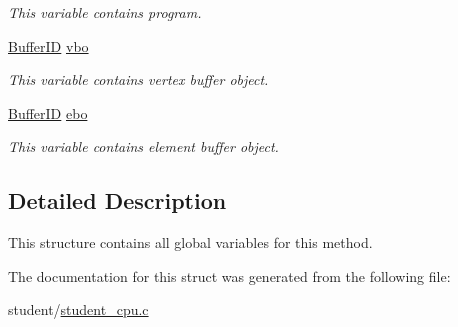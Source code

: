 \begin{DoxyCompactItemize}
\begin{DoxyCompactList}\small\item\em This variable contains program. \end{DoxyCompactList}\item 
\hyperlink{fwd_8h_a60a12bf4868ebe47cc571ce96a03f99c}{Buffer\+ID} \hyperlink{structPhongVariables_ab41615ade794f33643841f5ea1b6072e}{vbo}\hypertarget{structPhongVariables_ab41615ade794f33643841f5ea1b6072e}{}\label{structPhongVariables_ab41615ade794f33643841f5ea1b6072e}

\begin{DoxyCompactList}\small\item\em This variable contains vertex buffer object. \end{DoxyCompactList}\item 
\hyperlink{fwd_8h_a60a12bf4868ebe47cc571ce96a03f99c}{Buffer\+ID} \hyperlink{structPhongVariables_a5aa6df055cd88b0acbcccd99d5ff25cb}{ebo}\hypertarget{structPhongVariables_a5aa6df055cd88b0acbcccd99d5ff25cb}{}\label{structPhongVariables_a5aa6df055cd88b0acbcccd99d5ff25cb}

\begin{DoxyCompactList}\small\item\em This variable contains element buffer object. \end{DoxyCompactList}\end{DoxyCompactItemize}


\subsection{Detailed Description}
This structure contains all global variables for this method. 

The documentation for this struct was generated from the following file\+:\begin{DoxyCompactItemize}
\item 
student/\hyperlink{student__cpu_8c}{student\+\_\+cpu.\+c}\end{DoxyCompactItemize}
